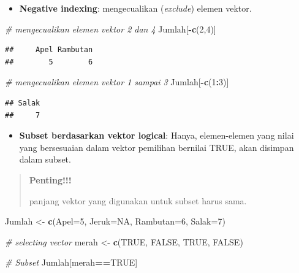 \documentclass[]{book}
\newenvironment{Shaded}{\begin{snugshade}}{\end{snugshade}}
\newcommand{\CommentTok}[1]{\textcolor[rgb]{0.56,0.35,0.01}{\textit{#1}}}
\newcommand{\DataTypeTok}[1]{\textcolor[rgb]{0.13,0.29,0.53}{#1}}
\newcommand{\DecValTok}[1]{\textcolor[rgb]{0.00,0.00,0.81}{#1}}
\newcommand{\KeywordTok}[1]{\textcolor[rgb]{0.13,0.29,0.53}{\textbf{#1}}}
\newcommand{\NormalTok}[1]{#1}
\newcommand{\OperatorTok}[1]{\textcolor[rgb]{0.81,0.36,0.00}{\textbf{#1}}}
\newcommand{\OtherTok}[1]{\textcolor[rgb]{0.56,0.35,0.01}{#1}}
\newcommand{\StringTok}[1]{\textcolor[rgb]{0.31,0.60,0.02}{#1}}
\providecommand{\tightlist}{%
  \setlength{\itemsep}{0pt}\setlength{\parskip}{0pt}}
\theoremstyle{definition}
\theoremstyle{definition}
\theoremstyle{definition}
\theoremstyle{remark}
\begin{document}
\begin{itemize}
\tightlist
\item
  \textbf{Negative indexing}: mengecualikan (\emph{exclude}) elemen vektor.
\end{itemize}

\begin{Shaded}
\begin{Highlighting}[]
\CommentTok{# mengecualikan elemen vektor 2 dan 4}
\NormalTok{Jumlah[}\OperatorTok{-}\KeywordTok{c}\NormalTok{(}\DecValTok{2}\NormalTok{,}\DecValTok{4}\NormalTok{)]}
\end{Highlighting}
\end{Shaded}

\begin{verbatim}
##     Apel Rambutan 
##        5        6
\end{verbatim}

\begin{Shaded}
\begin{Highlighting}[]
\CommentTok{# mengecualikan elemen vektor 1 sampai 3}
\NormalTok{Jumlah[}\OperatorTok{-}\KeywordTok{c}\NormalTok{(}\DecValTok{1}\OperatorTok{:}\DecValTok{3}\NormalTok{)]}
\end{Highlighting}
\end{Shaded}

\begin{verbatim}
## Salak 
##     7
\end{verbatim}

\begin{itemize}
\tightlist
\item
  \textbf{Subset berdasarkan vektor logical}: Hanya, elemen-elemen yang nilai yang bersesuaian dalam vektor pemilihan bernilai TRUE, akan disimpan dalam subset.
\end{itemize}

\begin{quote}
\textbf{Penting!!!}

panjang vektor yang digunakan untuk subset harus sama.
\end{quote}

\begin{Shaded}
\begin{Highlighting}[]
\NormalTok{Jumlah <-}\StringTok{ }\KeywordTok{c}\NormalTok{(}\DataTypeTok{Apel=}\DecValTok{5}\NormalTok{, }\DataTypeTok{Jeruk=}\OtherTok{NA}\NormalTok{, }\DataTypeTok{Rambutan=}\DecValTok{6}\NormalTok{, }\DataTypeTok{Salak=}\DecValTok{7}\NormalTok{)}

\CommentTok{# selecting vector}
\NormalTok{merah <-}\StringTok{ }\KeywordTok{c}\NormalTok{(}\OtherTok{TRUE}\NormalTok{, }\OtherTok{FALSE}\NormalTok{, }\OtherTok{TRUE}\NormalTok{, }\OtherTok{FALSE}\NormalTok{)}

\CommentTok{# Subset}
\NormalTok{Jumlah[merah}\OperatorTok{==}\OtherTok{TRUE}\NormalTok{]}
\end{Highlighting}
\end{Shaded}
\end{document}

